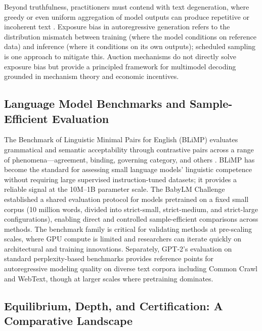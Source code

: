 Beyond truthfulness, practitioners must contend with text degeneration, where greedy or even uniform
aggregation of model outputs can produce repetitive or incoherent text \citep{Holtzman2020}.
Exposure bias in autoregressive generation \citep{Bengio2015} refers to the distribution mismatch between
training (where the model conditions on reference data) and inference (where it conditions on its own outputs);
scheduled sampling is one approach to mitigate this.
Auction mechanisms do not directly solve exposure bias but provide a principled framework for multimodel
decoding grounded in mechanism theory and economic incentives.

\subsection{Language Model Benchmarks and Sample-Efficient Evaluation}

The Benchmark of Linguistic Minimal Pairs for English (BLiMP) evaluates grammatical and semantic acceptability
through contrastive pairs across a range of phenomena---agreement, binding, governing category, and others
\citep{Warstadt2020}.
BLiMP has become the standard for assessing small language models' linguistic competence without requiring
large supervised instruction-tuned datasets; it provides a reliable signal at the 10M--1B parameter scale.
The BabyLM Challenge \citep{Warstadt2023} established a shared evaluation protocol for models pretrained on a
fixed small corpus (10 million words, divided into strict-small, strict-medium, and strict-large
configurations), enabling direct and controlled sample-efficient comparisons across methods.
The benchmark family is critical for validating methods at pre-scaling scales, where GPU compute is limited
and researchers can iterate quickly on architectural and training innovations.
Separately, GPT-2's evaluation on standard perplexity-based benchmarks \citep{Radford2019} provides reference
points for autoregressive modeling quality on diverse text corpora including Common Crawl and WebText, though
at larger scales where pretraining dominates.

\subsection{Equilibrium, Depth, and Certification: A Comparative Landscape}

